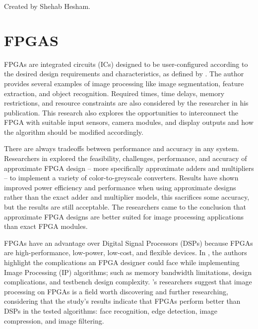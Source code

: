 	Created by Shehab Hesham.

\section{FPGAS}
\par	FPGAs are integrated circuits (ICs) designed to be user-configured according to the desired design requirements and characteristics, as defined by \cite{six}. The author provides several examples of image processing like image segmentation, feature extraction, and object recognition. Required times, time delays, memory restrictions, and resource constraints are also considered by the researcher in his publication. This research also explores the opportunities to interconnect the FPGA with suitable input sensors, camera modules, and display outputs and how the algorithm should be modified accordingly. \newline
\par There are always tradeoffs between performance and accuracy in any system. Researchers in \cite{one} explored the feasibility, challenges, performance, and accuracy of approximate FPGA design – more specifically approximate adders and multipliers – to implement a variety of color-to-greyscale converters. Results have shown improved power efficiency and performance when using approximate designs rather than the exact adder and multiplier models, this sacrifices some accuracy, but the results are still acceptable. The researchers came to the conclusion that approximate FPGA designs are better suited for image processing applications than exact FPGA modules. \newline
\par	FPGAs have an advantage over Digital Signal Processors (DSPs) because FPGAs are high-performance, low-power, low-cost, and flexible devices. In \cite{eight}, the authors highlight the complications an FPGA designer could face while implementing Image Processing (IP) algorithms; such as memory bandwidth limitations, design complications, and testbench design complexity. \cite{eight}’s researchers suggest that image processing on FPGAs is a field worth discovering and further researching, considering that the study’s results indicate that FPGAs perform better than DSPs in the tested algorithms: face recognition, edge detection, image compression, and image filtering. \newline
